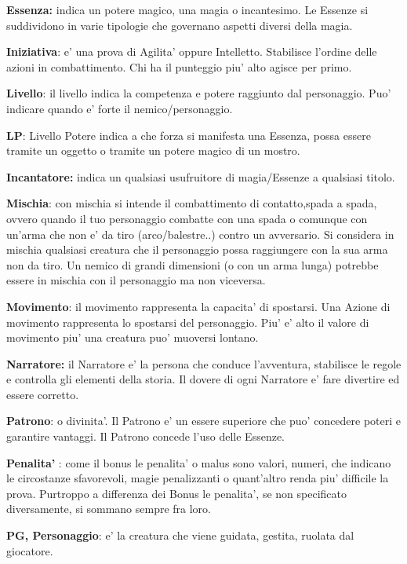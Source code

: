 \documentclass[a4paper,11pt,twoside,openany]{book}
\begin{document}
	\textbf{Essenza:} indica un potere magico, una magia o incantesimo. Le Essenze si suddividono in varie tipologie che governano aspetti diversi della magia.
	
	\textbf{Iniziativa}: e' una prova di Agilita' oppure Intelletto. Stabilisce l'ordine delle azioni in combattimento. Chi ha il punteggio piu' alto agisce per primo.
	
	\textbf{Livello}: il livello indica la competenza e potere raggiunto dal personaggio. Puo' indicare quando e' forte il nemico/personaggio. 
	
	\textbf{LP}: Livello Potere indica a che forza si manifesta una Essenza, possa essere tramite un oggetto o tramite un potere magico di un mostro.
	
	\textbf{Incantatore:} indica un qualsiasi usufruitore di magia/Essenze a qualsiasi titolo.
	
	\textbf{Mischia}: con mischia si intende il combattimento di contatto,spada a spada, ovvero quando il tuo personaggio combatte con una spada o comunque con un'arma che non e' da tiro (arco/balestre..) contro un avversario.
	Si considera in mischia qualsiasi creatura che il personaggio possa raggiungere con la sua arma non da tiro. Un nemico di grandi dimensioni (o con un arma lunga) potrebbe essere in mischia con il personaggio ma non viceversa.
	
	\textbf{Movimento}: il movimento rappresenta la capacita' di spostarsi. Una Azione di movimento rappresenta lo spostarsi del personaggio. Piu' e' alto il valore di movimento piu' una creatura puo' muoversi lontano.
	
	\textbf{Narratore:} il Narratore e' la persona che conduce l'avventura, stabilisce le regole e controlla gli elementi della storia. Il dovere di ogni Narratore e' fare divertire ed essere corretto.
	
	\textbf{Patrono}: o divinita'. Il Patrono e' un essere superiore che puo' concedere poteri e garantire vantaggi. Il Patrono concede l'uso delle Essenze.
	
	\textbf{Penalita'} : come il bonus le penalita' o malus sono valori, numeri, che indicano le circostanze sfavorevoli, magie penalizzanti o quant'altro renda piu' difficile la prova. Purtroppo a differenza dei Bonus le penalita', se non specificato diversamente, si sommano sempre fra loro. 
	
	\textbf{PG, Personaggio}: e' la creatura che viene guidata, gestita, ruolata dal giocatore.
	
\end{document}
